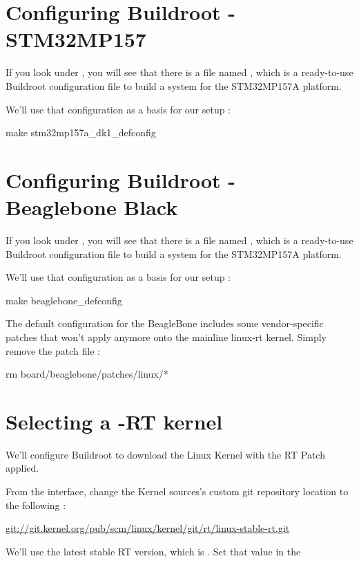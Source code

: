\section{Configuring Buildroot - STM32MP157}

If you look under , you will see that there is a file
named , which is a ready-to-use Buildroot
configuration file to build a system for the STM32MP157A platform.

We'll use that configuration as a basis for our setup :

\begin{bashinput}
make stm32mp157a_dk1_defconfig
\end{bashinput}

\section{Configuring Buildroot - Beaglebone Black}

If you look under , you will see that there is a file
named , which is a ready-to-use Buildroot
configuration file to build a system for the STM32MP157A platform.

We'll use that configuration as a basis for our setup :

\begin{bashinput}
make beaglebone_defconfig
\end{bashinput}

The default configuration for the BeagleBone includes some vendor-specific patches
that won't apply anymore onto the mainline linux-rt kernel. Simply remove the
patch file :

\begin{bashinput}
rm board/beaglebone/patches/linux/*
\end{bashinput}

\section{Selecting a -RT kernel}

We'll configure Buildroot to download the Linux Kernel with the RT Patch applied.

From the  interface, change the Kernel sources's custom
git repository location to the following :

\url{git://git.kernel.org/pub/scm/linux/kernel/git/rt/linux-stable-rt.git}

We'll use the latest stable RT version, which is . Set that
value in the 

